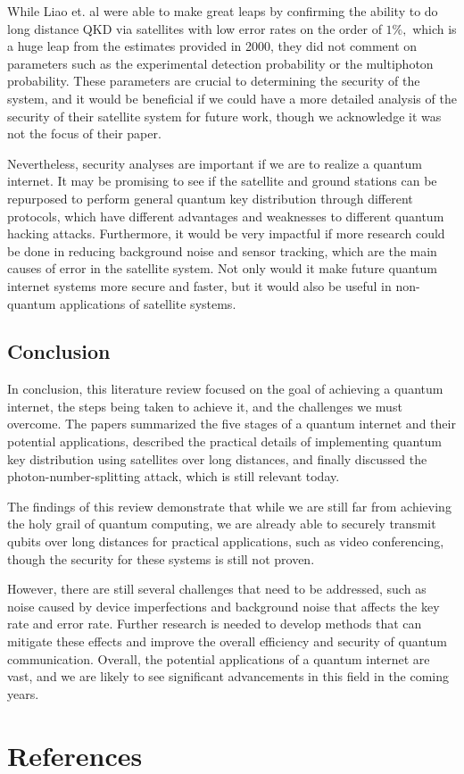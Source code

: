 \documentclass{article}
\numberwithin{equation}{section}
\begin{document}
While Liao et. al were able to make great leaps by confirming the ability to do long distance QKD via satellites with low error rates on the order of $1\%,$ which is a huge leap from the estimates provided in 2000, they did not comment on parameters such as the experimental detection probability or the multiphoton probability. These parameters are crucial to determining the security of the system, and it would be beneficial if we could have a more detailed analysis of the security of their satellite system for future work, though we acknowledge it was not the focus of their paper.

Nevertheless, security analyses are important if we are to realize a quantum internet. It may be promising to see if the satellite and ground stations can be repurposed to perform general quantum key distribution through different protocols, which have different advantages and weaknesses to different quantum hacking attacks. Furthermore, it would be very impactful if more research could be done in reducing background noise and sensor tracking, which are the main causes of error in the satellite system. Not only would it make future quantum internet systems more secure and faster, but it would also be useful in non-quantum applications of satellite systems.
\subsection{Conclusion}
In conclusion, this literature review focused on the goal of achieving a quantum internet, the steps being taken to achieve it, and the challenges we must overcome. The papers summarized the five stages of a quantum internet and their potential applications, described the practical details of implementing quantum key distribution using satellites over long distances, and finally discussed the photon-number-splitting attack, which is still relevant today.

The findings of this review demonstrate that while we are still far from achieving the holy grail of quantum computing, we are already able to securely transmit qubits over long distances for practical applications, such as video conferencing, though the security for these systems is still not proven.

However, there are still several challenges that need to be addressed, such as noise caused by device imperfections and background noise that affects the key rate and error rate. Further research is needed to develop methods that can mitigate these effects and improve the overall efficiency and security of quantum communication. Overall, the potential applications of a quantum internet are vast, and we are likely to see significant advancements in this field in the coming years.
\section{References}


\end{document}
